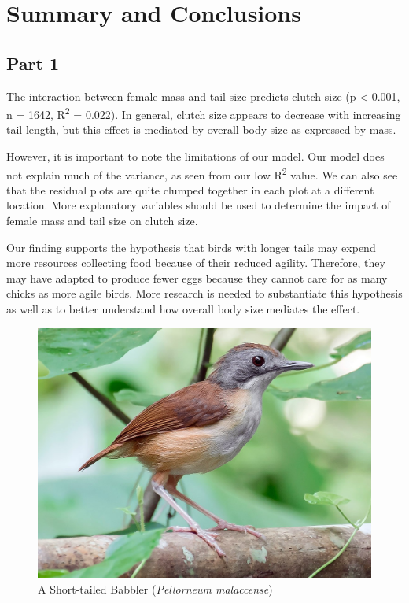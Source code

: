 \documentclass[
  12pt,
]{article}
\begin{document}
\newpage

\hypertarget{summary-and-conclusions}{%
\section{Summary and Conclusions}\label{summary-and-conclusions}}

\hypertarget{part-1}{%
\subsection{Part 1}\label{part-1}}

The interaction between female mass and tail size predicts clutch size
(p \textless{} 0.001, n = 1642, R\textsuperscript{2} = 0.022). In
general, clutch size appears to decrease with increasing tail length,
but this effect is mediated by overall body size as expressed by mass.

However, it is important to note the limitations of our model. Our model
does not explain much of the variance, as seen from our low
R\textsuperscript{2} value. We can also see that the residual plots are
quite clumped together in each plot at a different location. More
explanatory variables should be used to determine the impact of female
mass and tail size on clutch size.

Our finding supports the hypothesis that birds with longer tails may
expend more resources collecting food because of their reduced agility.
Therefore, they may have adapted to produce fewer eggs because they
cannot care for as many chicks as more agile birds. More research is
needed to substantiate this hypothesis as well as to better understand
how overall body size mediates the effect.

\begin{figure}
\centering
\includegraphics{Images/short-tailed_babbler.jpeg}
\caption{A Short-tailed Babbler (\emph{Pellorneum malaccense})}
\end{figure}
\end{document}
